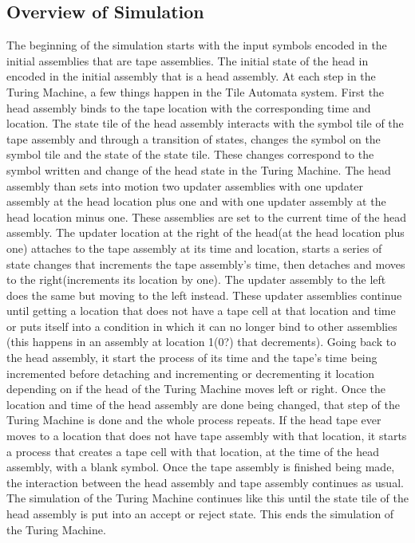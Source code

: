 \documentclass{article}
\begin{document}
\subsection{Overview of Simulation}

The beginning of the simulation starts with the input symbols encoded in the initial assemblies
that are tape assemblies.  The initial state of the head in encoded in the initial assembly that
is a head assembly.  At each step in the Turing Machine, a few things happen in the Tile Automata
system.  First the head assembly binds to the tape location with the corresponding time and
location.  The state tile of the head assembly interacts with the symbol tile of the tape assembly
and through a transition of states, changes the symbol on the symbol tile and the state of the
state tile.  These changes correspond to the symbol written and change of the head state in the
Turing Machine.  The head assembly than sets into motion two updater assemblies with one updater
assembly at the head location plus one and with one updater assembly at the head location minus
one.  These assemblies are set to the current time of the head assembly.  The updater
location at the right of the head(at the head location plus one) attaches to the tape assembly at
its time and location, starts a series of state changes that increments the tape assembly's
time, then detaches and moves to the right(increments its location by one).  The updater assembly
to the left does the same but moving to the left instead. These updater assemblies continue until
getting a location that does not have a tape cell at that location and time or puts itself into a
condition in which it can no longer bind to other assemblies (this happens in an assembly at
location 1(0?) that decrements).  Going back to the head assembly, it start the process of its time
and the tape's time being incremented before detaching and incrementing or decrementing it location
depending on if the head of the Turing Machine moves left or right.  Once the location and time of
the head assembly are done being changed, that step of the Turing Machine is done and the whole
process repeats.  If the head tape ever moves to a location that does not have tape assembly with
that location, it starts a process that creates a tape cell with that location, at the time of the
head assembly, with a blank symbol.  Once the tape assembly is finished being made, the interaction
between the head assembly and tape assembly continues as usual.  The simulation of the Turing
Machine continues like this until the state tile of the head assembly is put into an accept or
reject state.  This ends the simulation of the Turing Machine.
\end{document}
